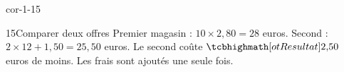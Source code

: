 \begin{blocLivre}{cor-1-15}\begin{corrige}{15}{Comparer deux offres}
Premier magasin : $10\times2{,}80=28$ euros. Second : $2\times12+1{,}50=25{,}50$ euros. Le second coûte $\res{2{,}50}$ euros de moins. Les frais sont ajoutés une seule fois.
\end{corrige}\end{blocLivre}
